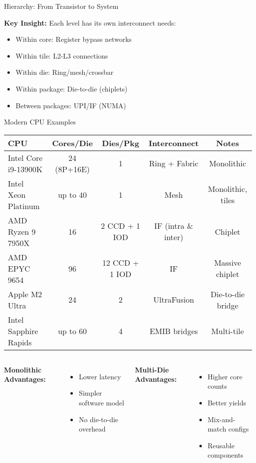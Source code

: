 \documentclass[aspectratio=169,12pt]{beamer}
\begin{document}
\begin{frame}{Hierarchy: From Transistor to System}
\begin{center}
\begin{tikzpicture}[scale=0.75,
    level/.style={draw, thick, minimum width=2.5cm, minimum height=0.8cm}
]
\end{tikzpicture}
\end{center}

\textbf{Key Insight:} Each level has its own interconnect needs:
\begin{itemize}
\item Within core: Register bypass networks
\item Within tile: L2-L3 connections
\item Within die: Ring/mesh/crossbar
\item Within package: Die-to-die (chiplets)
\item Between packages: UPI/IF (NUMA)
\end{itemize}
\end{frame}

\begin{frame}{Modern CPU Examples}
\begin{center}
\footnotesize
\begin{tabular}{l|c|c|c|c}
\toprule
\textbf{CPU} & \textbf{Cores/Die} & \textbf{Dies/Pkg} & \textbf{Interconnect} & \textbf{Notes} \\
\midrule
Intel Core i9-13900K & 24 (8P+16E) & 1 & Ring + Fabric & Monolithic \\
Intel Xeon Platinum & up to 40 & 1 & Mesh & Monolithic, tiles \\
\midrule
AMD Ryzen 9 7950X & 16 & 2 CCD + 1 IOD & IF (intra \& inter) & Chiplet \\
AMD EPYC 9654 & 96 & 12 CCD + 1 IOD & IF & Massive chiplet \\
\midrule
Apple M2 Ultra & 24 & 2 & UltraFusion & Die-to-die bridge \\
\midrule
Intel Sapphire Rapids & up to 60 & 4 & EMIB bridges & Multi-tile \\
\bottomrule
\end{tabular}
\end{center}

\vspace{0.5cm}
\begin{columns}[T]
\textbf{Monolithic Advantages:}
\begin{itemize}
\item Lower latency
\item Simpler software model
\item No die-to-die overhead
\end{itemize}

\textbf{Multi-Die Advantages:}
\begin{itemize}
\item Higher core counts
\item Better yields
\item Mix-and-match configs
\item Reusable components
\end{itemize}
\end{columns}


\end{frame}
\end{document}
